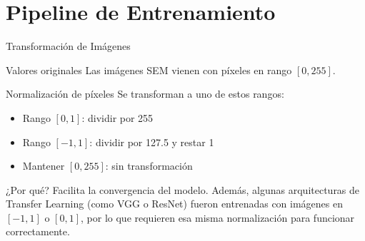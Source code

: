 \documentclass[aspectratio=169, 10pt]{beamer}
\begin{document}
\section{Pipeline de Entrenamiento}

\begin{frame}{Transformación de Imágenes}
    \begin{block}{Valores originales}
        Las imágenes SEM vienen con píxeles en rango $[0, 255]$.
    \end{block}
    
    \begin{exampleblock}{Normalización de píxeles}
        Se transforman a uno de estos rangos:
        \begin{itemize}
            \item Rango $[0, 1]$: dividir por 255
            \item Rango $[-1, 1]$: dividir por 127.5 y restar 1
            \item Mantener $[0, 255]$: sin transformación
        \end{itemize}
    \end{exampleblock}
    
    \begin{alertblock}{¿Por qué?}
        Facilita la convergencia del modelo. Además, algunas arquitecturas de Transfer Learning (como VGG o ResNet) fueron entrenadas con imágenes en $[-1,1]$ o $[0,1]$, por lo que requieren esa misma normalización para funcionar correctamente.
    \end{alertblock}
\end{frame}
\end{document}
